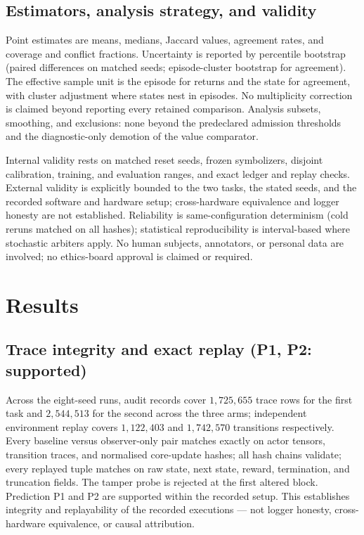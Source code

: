 \documentclass[11pt,a4paper]{article}
\theoremstyle{definition}
\begin{document}
\subsection{Estimators, analysis strategy, and validity}

Point estimates are means, medians, Jaccard values, agreement rates, and
coverage and conflict fractions. Uncertainty is reported by percentile
bootstrap (paired differences on matched seeds; episode-cluster bootstrap for
agreement). The effective sample unit is the episode for returns and the
state for agreement, with cluster adjustment where states nest in episodes.
No multiplicity correction is claimed beyond reporting every retained
comparison. Analysis subsets, smoothing, and exclusions: none beyond the
predeclared admission thresholds and the diagnostic-only demotion of the
value comparator.

Internal validity rests on matched reset seeds, frozen symbolizers, disjoint
calibration, training, and evaluation ranges, and exact ledger and replay
checks. External validity is explicitly bounded to the two tasks, the stated
seeds, and the recorded software and hardware setup; cross-hardware
equivalence and logger honesty are not established. Reliability is
same-configuration determinism (cold reruns matched on all hashes);
statistical reproducibility is interval-based where stochastic arbiters apply.
No human subjects, annotators, or personal data are involved; no ethics-board
approval is claimed or required.

\section{Results}
\label{sec:results}

\subsection{Trace integrity and exact replay (P1, P2: supported)}

Across the eight-seed runs, audit records cover $1{,}725{,}655$ trace rows
for the first task and $2{,}544{,}513$ for the second across the three arms;
independent environment replay covers $1{,}122{,}403$ and $1{,}742{,}570$
transitions respectively. Every baseline versus observer-only pair matches
exactly on actor tensors, transition traces, and normalised core-update
hashes; all hash chains validate; every replayed tuple matches on raw state,
next state, reward, termination, and truncation fields. The tamper probe is
rejected at the first altered block. Prediction P1 and P2 are supported
within the recorded setup. This establishes integrity and replayability of
the recorded executions --- not logger honesty, cross-hardware equivalence,
or causal attribution.
\end{document}
